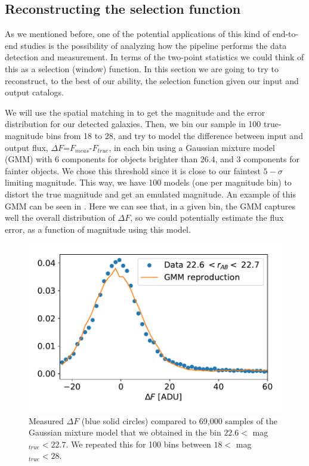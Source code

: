 \documentclass[\docopts]{\docclass}
\begin{document}
\subsection{Reconstructing the selection function}
As we mentioned before, one of the potential applications of this kind of end-to-end studies is the possibility of analyzing how the pipeline performs the data detection and measurement. In terms of the two-point statistics we could think of this as a selection (window) function. In this section we are going to try to reconstruct, to the best of our ability, the selection function given our input and output catalogs.

We will use the spatial matching in  to get the magnitude and the error distribution for our detected galaxies. Then, we bin our sample in 100 true-magnitude bins from 18 to 28, and try to model the difference between input and output flux, $\Delta F$=$F_{meas}$-$F_{true}$, in each bin using a Gaussian mixture model (GMM) with 6 components for objects brighter than 26.4, and 3 components for fainter objects. We chose this threshold since it is close to our faintest $5-\sigma$ limiting magnitude. This way, we have 100 models (one per magnitude bin) to distort the true magnitude and get an emulated magnitude. An example of this GMM can be seen in . Here we can see that, in a given bin, the GMM captures well the overall distribution of $\Delta F$, so we could potentially estimate the flux error, as a function of magnitude using this model.
\begin{figure}
\centering
\includegraphics[width=0.9\columnwidth]{example_GMM}
\caption{Measured $\Delta F$ (blue solid circles) compared to 69,000 samples of the Gaussian mixture model that we obtained in the bin $22.6 <$ mag$_{true} < 22.7$. We repeated this for 100 bins between $18 <$ mag$_{true} < 28$.}
\label{fig:example_GMM}
\end{figure}
\end{document}
